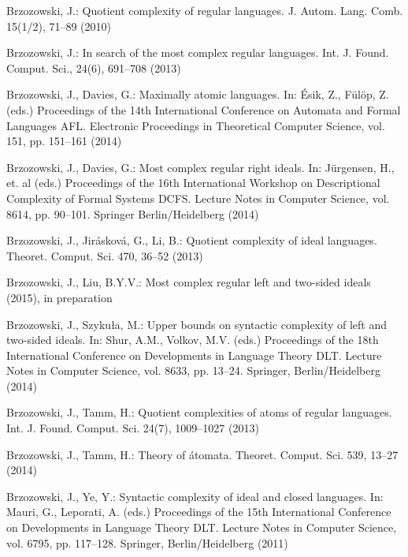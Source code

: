 \documentclass{llncs}
\begin{document}
\providecommand{\noopsort}[1]{}
\begin{thebibliography}{10}
\providecommand{\url}[1]{\texttt{#1}}
\providecommand{\urlprefix}{URL }

Brzozowski, J.: Quotient complexity of regular languages. J. Autom. Lang. Comb.
   15(1/2),  71--89 (2010)

Brzozowski, J.: In search of the most complex regular languages. Int. J. Found.
  Comput. Sci.,  24(6),  691--708 (2013)

Brzozowski, J., Davies, G.: Maximally atomic languages. In: \'Esik, Z.,
  F\"ul\"op, Z. (eds.) Proceedings of the 14th International Conference on
  Automata and Formal Languages AFL\/. Electronic Proceedings in
  Theoretical Computer Science, vol. 151, pp. 151--161 (2014)

Brzozowski, J., Davies, G.: Most complex regular right ideals. In: J\"urgensen,
  H., et. al (eds.) Proceedings of the 16th International Workshop on
  Descriptional Complexity of Formal Systems DCFS\/. Lecture Notes in
  Computer Science, vol. 8614, pp. 90--101. Springer Berlin/Heidelberg (2014)

Brzozowski, J., Jir{\'a}skov{\'a}, G., Li, B.: Quotient complexity of ideal
  languages. Theoret. Comput. Sci.  470,  36--52 (2013)

Brzozowski, J., Liu, B.Y.V.: Most complex regular left and two-sided ideals
  (2015), in preparation

Brzozowski, J., Szyku{\l}a, M.: Upper bounds on syntactic complexity of left
  and two-sided ideals. In: Shur, A.M., Volkov, M.V. (eds.) Proceedings of the
  18th International Conference on Developments in Language Theory DLT\/.
  Lecture Notes in Computer Science, vol. 8633, pp. 13--24. Springer,
  Berlin/Heidelberg (2014)

Brzozowski, J., Tamm, H.: Quotient complexities of atoms of regular languages.
  Int. J. Found. Comput. Sci.  24(7),  1009--1027 (2013)

Brzozowski, J., Tamm, H.: Theory of \'atomata. Theoret. Comput. Sci.  539,
  13--27 (2014)

Brzozowski, J., Ye, Y.: Syntactic complexity of ideal and closed languages. In:
  Mauri, G., Leporati, A. (eds.) Proceedings of the 15th International
  Conference on Developments in Language Theory DLT\/. Lecture Notes in
  Computer Science, vol. 6795, pp. 117--128. Springer, Berlin/Heidelberg (2011)


\end{thebibliography}
\end{document}
